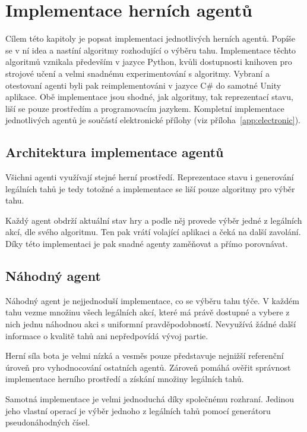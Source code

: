 \chapter{Implementace herních agentů}
\label{sec:agents}

Cílem této kapitoly je popsat implementaci jednotlivých herních agentů. Popíše se v ní idea a nastíní algoritmy rozhodující o výběru tahu.
Implementace těchto algoritmů vznikala především v jazyce Python, kvůli dostupnosti knihoven pro strojové učení a velmi snadnému experimentování
s algoritmy. Vybraní a otestovaní agenti byli pak reimplementováni v jazyce C\# do samotné Unity aplikace. Obě implementace jsou shodné, jak algoritmy,
tak reprezentací stavu, liší se pouze prostředím a programovacím jazykem.
Kompletní implementace jednotlivých agentů je součástí elektronické přílohy (viz příloha~\ref{app:electronic}).

\section{Architektura implementace agentů}

Všichni agenti využívají stejné herní prostředí. Reprezentace stavu i generování legálních tahů je tedy totožné a implementace se liší pouze algoritmy pro
výběr tahu. 

Každý agent obdrží aktuální stav hry a podle něj provede výběr jedné z legálních akcí, dle svého algoritmu. Ten pak vrátí volající aplikaci a čeká na další
zavolání. Díky této implementaci je pak snadné agenty zaměňovat a přímo porovnávat.

\section{Náhodný agent}

Náhodný agent je nejjednoduší implementace, co se výběru tahu týče. V každém tahu vezme množinu všech legálních akcí, které má právě dostupné a vybere
z nich jednu náhodnou akci s uniformní pravděpodobností. Nevyužívá žádné další informace o kvalitě tahů ani nepředpovídá vývoj partie.

Herní síla bota je velmi nízká a vesměs pouze představuje nejnižší referenční úroveň pro vyhodnocování ostatních agentů. Zároveň pomáhá ověřit
správnost implementace herního prostředí a získání množiny legálních tahů.

Samotná implementace je velmi jednoduchá díky společnému rozhraní. Jedinou jeho vlastní operací je výběr jednoho z legálních tahů pomocí generátoru
pseudonáhodných čísel.

